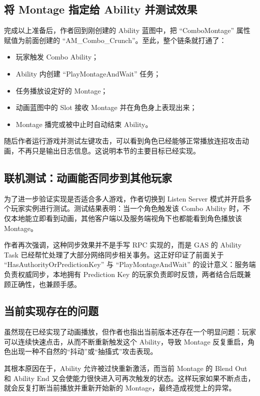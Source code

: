 \subsection{将 Montage 指定给 Ability 并测试效果}

完成以上准备后，作者回到刚创建的 Ability 蓝图中，把 ``ComboMontage'' 属性赋值为前面创建的 ``AM\_Combo\_Crunch''。至此，整个链条就打通了：

\begin{itemize}
	\item 玩家触发 Combo Ability；
	\item Ability 内创建 ``PlayMontageAndWait'' 任务；
	\item 任务播放设定好的 Montage；
	\item 动画蓝图中的 Slot 接收 Montage 并在角色身上表现出来；
	\item Montage 播完或被中止时自动结束 Ability。
\end{itemize}

随后作者运行游戏并测试左键攻击，可以看到角色已经能够正常播放连招攻击动画，不再只是输出日志信息。这说明本节的主要目标已经实现。

\subsection{联机测试：动画能否同步到其他玩家}

为了进一步验证实现是否适合多人游戏，作者切换到 Listen Server 模式并开启多个玩家实例进行测试。测试结果表明：当一个角色触发该 Combo Ability 时，不仅本地能立即看到动画，其他客户端以及服务端视角下也都能看到角色播放该 Montage。

作者再次强调，这种同步效果并不是手写 RPC 实现的，而是 GAS 的 Ability Task 已经帮忙处理了大部分网络同步相关事务。这正好印证了前面关于 ``HasAuthorityOrPredictionKey'' 与 ``PlayMontageAndWait'' 的设计意义：服务端负责权威同步，本地拥有 Prediction Key 的玩家负责即时反馈，两者结合后既兼顾正确性，也兼顾手感。

\subsection{当前实现存在的问题}

虽然现在已经实现了动画播放，但作者也指出当前版本还存在一个明显问题：玩家可以连续快速点击，从而不断重新触发这个 Ability，导致 Montage 反复重启，角色出现一种不自然的“抖动”或“抽搐式”攻击表现。

其根本原因在于，Ability 允许被过快重新激活，而当前 Montage 的 Blend Out 和 Ability End 又会使能力很快进入可再次触发的状态。这样玩家如果不断点击，就会反复打断当前播放并重新开始新的 Montage，最终造成视觉上的异常。

